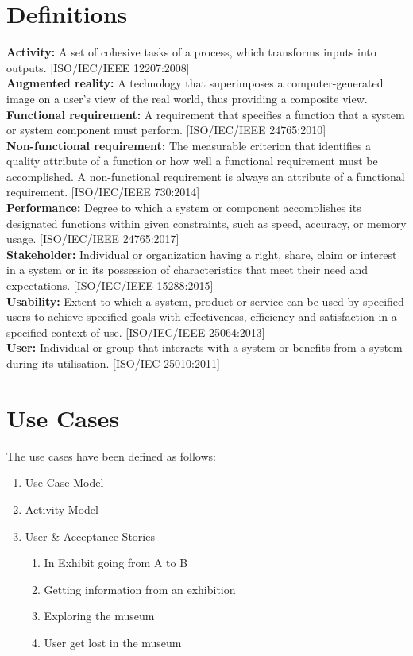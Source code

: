 {\section{Definitions}
\textbf{Activity:} A set of cohesive tasks of a process, which transforms inputs into outputs. [ISO/IEC/IEEE 12207:2008]\\
\newline
\textbf{Augmented reality:} A technology that superimposes a computer-generated image on a user's view of the real world, thus providing a composite view. \\
\newline
\textbf{Functional requirement:} A requirement that specifies a function that a system or system component must perform. [ISO/IEC/IEEE 24765:2010]\\
\newline
\textbf{Non-functional requirement:} The measurable criterion that identifies a quality attribute of a function or how well a functional requirement must be accomplished. A non-functional requirement is always an attribute of a functional requirement. [ISO/IEC/IEEE 730:2014]\\
\newline
\textbf{Performance:} Degree to which a system or component accomplishes its designated functions within given constraints, such as speed, accuracy, or memory usage. [ISO/IEC/IEEE 24765:2017]\\
\newline
\textbf{Stakeholder:} Individual or organization having a right, share, claim or interest in a system or in its possession of characteristics that meet their need and expectations. [ISO/IEC/IEEE 15288:2015]\\
\newline
\textbf{Usability:} Extent to which a system, product or service can be used by specified users to achieve specified goals with effectiveness, efficiency and satisfaction in a specified context of use. [ISO/IEC/IEEE 25064:2013]\\
\newline
\textbf{User:} Individual or group that interacts with a system or benefits from a system during its utilisation. [ISO/IEC 25010:2011]

\section{Use Cases}
The use cases have been defined as follows:
\begin{enumerate}
    \item Use Case Model
    \item Activity Model
    \item User \& Acceptance Stories
    \begin{enumerate}
        \item In Exhibit going from A to B
        \item Getting information from an exhibition
        \item Exploring the museum
        \item User get lost in the museum
    \end{enumerate}
\end{enumerate}

}
